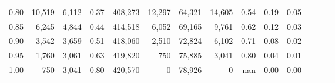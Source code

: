 \begin{tabular}{rrrrrrrrrrrrrr}
0.80 &  10,519 &  6,112 &  0.37 &  408,273 &   12,297 &  64,321 &  14,605 &  0.54 &  0.19 &      0.05 \\
0.85 &   6,245 &  4,844 &  0.44 &  414,518 &    6,052 &  69,165 &   9,761 &  0.62 &  0.12 &      0.03 \\
0.90 &   3,542 &  3,659 &  0.51 &  418,060 &    2,510 &  72,824 &   6,102 &  0.71 &  0.08 &      0.02 \\
0.95 &   1,760 &  3,061 &  0.63 &  419,820 &      750 &  75,885 &   3,041 &  0.80 &  0.04 &      0.01 \\
1.00 &     750 &  3,041 &  0.80 &  420,570 &        0 &  78,926 &       0 &   nan &  0.00 &      0.00 \\
\bottomrule
\end{tabular}
